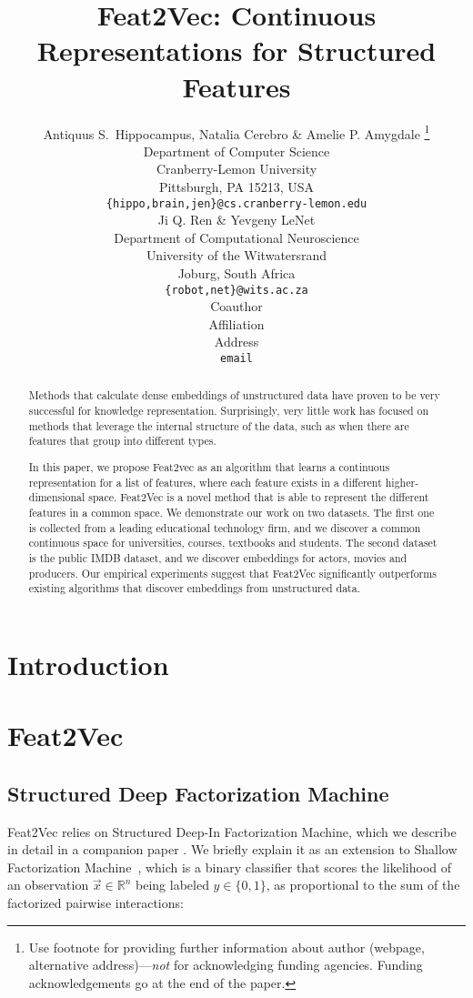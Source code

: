 \documentclass{article} %
\title{Feat2Vec: Continuous Representations for Structured Features}
\author{Antiquus S.~Hippocampus, Natalia Cerebro \& Amelie P. Amygdale \thanks{ Use footnote for providing further information
about author (webpage, alternative address)---\emph{not} for acknowledging
funding agencies.  Funding acknowledgements go at the end of the paper.} \\
Department of Computer Science\\
Cranberry-Lemon University\\
Pittsburgh, PA 15213, USA \\
\texttt{\{hippo,brain,jen\}@cs.cranberry-lemon.edu} \\
\And
Ji Q. Ren \& Yevgeny LeNet \\
Department of Computational Neuroscience \\
University of the Witwatersrand \\
Joburg, South Africa \\
\texttt{\{robot,net\}@wits.ac.za} \\
\AND
Coauthor \\
Affiliation \\
Address \\
\texttt{email}
}
\newcommand{\vect}[1]{\vec{#1}}
\renewcommand{\cite}[1]{\citep{#1}}
\begin{document}
\maketitle

\begin{abstract}
Methods that calculate dense embeddings of unstructured data have proven to be very successful for knowledge representation.
Surprisingly, very little work has focused on methods that leverage the internal structure of the data, such as when there are features that  group into different types.

In this paper, we propose Feat2vec as an algorithm that learns a continuous representation for a list of features, where each feature exists in a different higher-dimensional space. 
Feat2Vec is a novel method that is able  to represent the different features in a common space. 
We demonstrate our work on two datasets.  
The first one is collected from a leading educational technology firm, and we discover a common continuous space for universities, courses, textbooks and students.  
The second dataset is the public IMDB dataset, and we discover embeddings for actors, movies and producers. 
Our empirical experiments suggest that Feat2Vec significantly outperforms existing algorithms that discover embeddings from unstructured data.
 
\end{abstract}

\section{Introduction}

\section{Feat2Vec}
\subsection{Structured Deep Factorization Machine}

Feat2Vec relies on Structured Deep-In Factorization Machine, which we describe in detail in a companion paper \cite{deepfm}.
We briefly explain it as an extension to Shallow Factorization Machine~\cite{rendle2010factorization}, which is a binary classifier that scores the likelihood of an observation $\vect{x} \in \mathbb{R}^n$ being labeled  $y \in \{0,1\}$, as proportional to the sum of the factorized pairwise interactions:
\end{document}
